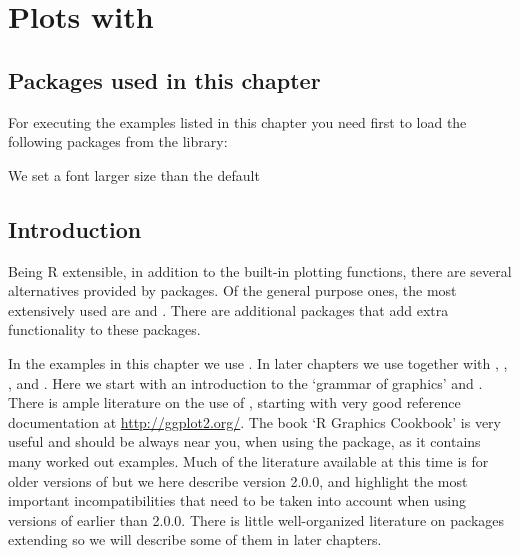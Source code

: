\documentclass[paper=a4,10pt,div=17,headsepline,BCOR=12mm,twoside,open=right]{scrbook}\usepackage{knitr}
\begin{document}
\chapter[Plots with ggpplot]{Plots with \ggplot}\label{chap:R:plotting}

\section{Packages used in this chapter}

For executing the examples listed in this chapter you need first to load the following packages from the library:

\begin{knitrout}\footnotesize
{}\color{fgcolor}\begin{kframe}
\begin{alltt}
\end{alltt}
\end{kframe}
\end{knitrout}

We set a font larger size than the default
\begin{knitrout}\footnotesize
{}\color{fgcolor}\begin{kframe}
\begin{alltt}
\hlstd{(}\hlstd{(}\hlstd{))}
\end{alltt}
\end{kframe}
\end{knitrout}




\section{Introduction}

Being R extensible, in addition to the built-in plotting functions, there are several alternatives provided by packages. Of the general purpose ones, the most extensively used are  and \ggplot. There are additional packages that add extra functionality to these packages.

In the examples in this chapter we use \ggplot. In later chapters we use \ggplot together with \ggmap, \ggtern, \ggrepel, and \ggpmisc. Here we start with an introduction to the `grammar of graphics' and \ggplot. There is ample literature on the use of \ggplot, starting with very good reference documentation at \url{http://ggplot2.org/}. The book `R Graphics Cookbook' \autocite{Chang2013} is very useful and should be always near you, when using the package, as it contains many worked out examples. Much of the literature available at this time is for older versions of \ggplot but we here describe version 2.0.0, and highlight the most important incompatibilities that need to be taken into account when using versions of \ggplot earlier than 2.0.0. There is little well-organized literature on packages extending \ggplot so we will describe some of them in later chapters.
\end{document}
